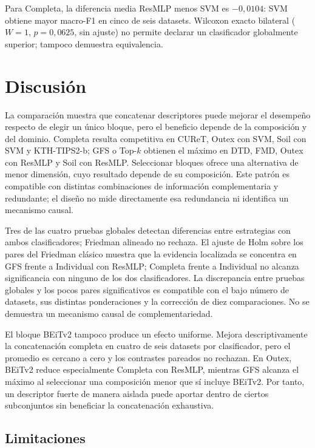 \documentclass[a4paper,fleqn]{cas-sc}
\begin{document}


Para Completa, la diferencia media ResMLP menos SVM es $-0{,}0104$: SVM obtiene mayor macro-F1 en cinco de seis datasets. Wilcoxon exacto bilateral ($W=1$, $p=0{,}0625$, sin ajuste) no permite declarar un clasificador globalmente superior; tampoco demuestra equivalencia.

\section{Discusión}\label{sec:discusion}

La comparación muestra que concatenar descriptores puede mejorar el desempeño respecto de elegir un único bloque, pero el beneficio depende de la composición y del dominio. Completa resulta competitiva en CUReT, Outex con SVM, Soil con SVM y KTH-TIPS2-b; GFS o Top-$k$ obtienen el máximo en DTD, FMD, Outex con ResMLP y Soil con ResMLP. Seleccionar bloques ofrece una alternativa de menor dimensión, cuyo resultado depende de su composición. Este patrón es compatible con distintas combinaciones de información complementaria y redundante; el diseño no mide directamente esa redundancia ni identifica un mecanismo causal.

Tres de las cuatro pruebas globales detectan diferencias entre estrategias con ambos clasificadores; Friedman alineado no rechaza. El ajuste de Holm sobre los pares del Friedman clásico muestra que la evidencia localizada se concentra en GFS frente a Individual con ResMLP; Completa frente a Individual no alcanza significancia con ninguno de los dos clasificadores. La discrepancia entre pruebas globales y los pocos pares significativos es compatible con el bajo número de datasets, sus distintas ponderaciones y la corrección de diez comparaciones. No se demuestra un mecanismo causal de complementariedad.

El bloque BEiTv2 tampoco produce un efecto uniforme. Mejora descriptivamente la concatenación completa en cuatro de seis datasets por clasificador, pero el promedio es cercano a cero y los contrastes pareados no rechazan. En Outex, BEiTv2 reduce especialmente Completa con ResMLP, mientras GFS alcanza el máximo al seleccionar una composición menor que sí incluye BEiTv2. Por tanto, un descriptor fuerte de manera aislada puede aportar dentro de ciertos subconjuntos sin beneficiar la concatenación exhaustiva.

\subsection{Limitaciones}
\end{document}
